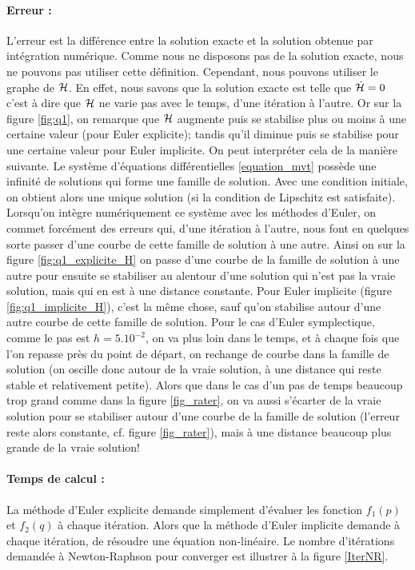 \paragraph{Erreur : }
L'erreur est la différence entre la solution exacte et la solution obtenue par intégration numérique. Comme nous ne disposons pas de la solution exacte, nous ne pouvons pas utiliser cette définition. Cependant, nous pouvons utiliser le graphe de $\mathcal{H}$. 
En effet, nous savons que la solution exacte est telle que $\dot{\mathcal{H}} = 0$ c'est à dire que $\mathcal{H}$ ne varie pas avec le temps, d'une itération à l'autre. Or sur la figure \ref{fig:q1}, on remarque que $\mathcal{H}$ augmente puis se stabilise plus ou moins à une certaine valeur (pour Euler explicite); tandis qu'il diminue puis se stabilise pour une certaine valeur pour Euler implicite. 
On peut interpréter cela de la manière suivante. Le système d'équations différentielles \ref{equation_mvt} possède une infinité de solutions qui forme une famille de solution. Avec une condition initiale, on obtient alors une unique solution (si la condition de Lipschitz est satisfaite). 
Lorsqu'on intègre numériquement ce système avec les méthodes d'Euler, on commet forcément des erreurs qui, d'une itération à l'autre, nous font en quelques sorte passer d'une courbe de cette famille de solution à une autre. 
Ainsi on sur la figure \ref{fig:q1_explicite_H} on passe d'une courbe de la famille de solution à une autre pour ensuite se stabiliser au alentour d'une solution qui n'est pas la vraie solution, mais qui en est à une distance constante. Pour Euler implicite (figure \ref{fig:q1_implicite_H}), c'est la même chose, sauf qu'on stabilise autour d'une autre courbe de cette famille de solution. 
Pour le cas d'Euler symplectique, comme le pas est $h=5.10^{-2}$, on va plus loin dans le temps, et à chaque fois que l'on repasse près du point de départ, on rechange de courbe dans la famille de solution (on oscille donc autour de la vraie solution, à une distance qui reste stable et relativement petite). Alors que dans le cas d'un pas de temps beaucoup trop grand comme dans la figure \ref{fig_rater}, on va aussi s'écarter de la vraie solution pour se stabiliser autour d'une courbe de la famille de solution (l'erreur reste alors constante, cf. figure \ref{fig_rater}), mais à une distance beaucoup plus grande de la vraie solution!



\paragraph{Temps de calcul : }
La méthode d'Euler explicite demande simplement d'évaluer les fonction $f_1(p)$ et $f_2(q)$ à chaque itération. Alors que la méthode d'Euler implicite demande à chaque itération, de résoudre une équation non-linéaire. Le nombre d'itérations demandée à Newton-Raphson pour converger est illustrer à la figure \ref{IterNR}.

